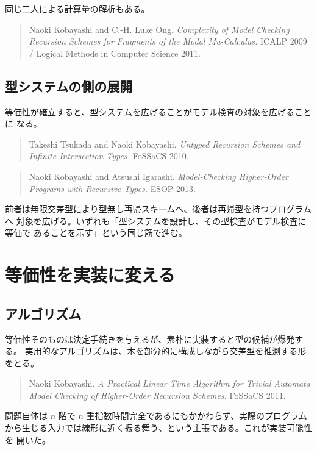 \documentclass[11pt,a4paper]{ltjsarticle}
\begin{document}
同じ二人による計算量の解析もある。

\begin{quote}
Naoki Kobayashi and C.-H. Luke Ong.
\emph{Complexity of Model Checking Recursion Schemes for Fragments of the
Modal Mu-Calculus.}
ICALP 2009 / Logical Methods in Computer Science 2011.
\end{quote}

\subsection{型システムの側の展開}

等価性が確立すると、型システムを広げることがモデル検査の対象を広げることに
なる。

\begin{quote}
Takeshi Tsukada and Naoki Kobayashi.
\emph{Untyped Recursion Schemes and Infinite Intersection Types.}
FoSSaCS 2010.
\end{quote}

\begin{quote}
Naoki Kobayashi and Atsushi Igarashi.
\emph{Model-Checking Higher-Order Programs with Recursive Types.}
ESOP 2013.
\end{quote}

前者は無限交差型により型無し再帰スキームへ、後者は再帰型を持つプログラムへ
対象を広げる。いずれも「型システムを設計し、その型検査がモデル検査に等価で
あることを示す」という同じ筋で進む。

\section{等価性を実装に変える}

\subsection{アルゴリズム}

等価性そのものは決定手続きを与えるが、素朴に実装すると型の候補が爆発する。
実用的なアルゴリズムは、木を部分的に構成しながら交差型を推測する形をとる。

\begin{quote}
Naoki Kobayashi.
\emph{A Practical Linear Time Algorithm for Trivial Automata Model Checking
of Higher-Order Recursion Schemes.}
FoSSaCS 2011.
\end{quote}

問題自体は $n$ 階で $n$ 重指数時間完全であるにもかかわらず、実際のプログラム
から生じる入力では線形に近く振る舞う、という主張である。これが実装可能性を
開いた。
\end{document}
